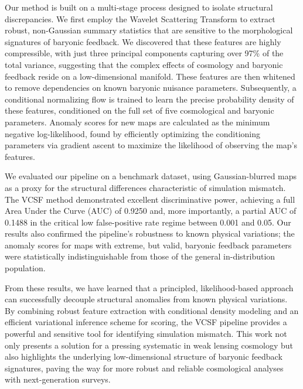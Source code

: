 \documentclass[]{article}
\begin{document}
Our method is built on a multi-stage process designed to isolate structural discrepancies. We first employ the Wavelet Scattering Transform to extract robust, non-Gaussian summary statistics that are sensitive to the morphological signatures of baryonic feedback. We discovered that these features are highly compressible, with just three principal components capturing over 97\% of the total variance, suggesting that the complex effects of cosmology and baryonic feedback reside on a low-dimensional manifold. These features are then whitened to remove dependencies on known baryonic nuisance parameters. Subsequently, a conditional normalizing flow is trained to learn the precise probability density of these features, conditioned on the full set of five cosmological and baryonic parameters. Anomaly scores for new maps are calculated as the minimum negative log-likelihood, found by efficiently optimizing the conditioning parameters via gradient ascent to maximize the likelihood of observing the map's features.

We evaluated our pipeline on a benchmark dataset, using Gaussian-blurred maps as a proxy for the structural differences characteristic of simulation mismatch. The VCSF method demonstrated excellent discriminative power, achieving a full Area Under the Curve (AUC) of 0.9250 and, more importantly, a partial AUC of 0.1488 in the critical low false-positive rate regime between 0.001 and 0.05. Our results also confirmed the pipeline's robustness to known physical variations; the anomaly scores for maps with extreme, but valid, baryonic feedback parameters were statistically indistinguishable from those of the general in-distribution population.

From these results, we have learned that a principled, likelihood-based approach can successfully decouple structural anomalies from known physical variations. By combining robust feature extraction with conditional density modeling and an efficient variational inference scheme for scoring, the VCSF pipeline provides a powerful and sensitive tool for identifying simulation mismatch. This work not only presents a solution for a pressing systematic in weak lensing cosmology but also highlights the underlying low-dimensional structure of baryonic feedback signatures, paving the way for more robust and reliable cosmological analyses with next-generation surveys.


{}

\end{document}
